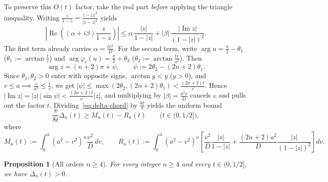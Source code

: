\documentclass[11pt,a4paper]{article}
\newcommand{\RePart}{\operatorname{Re}}
\newcommand{\ImPart}{\operatorname{Im}}
\newtheorem{proposition}{Proposition}[section]
\theoremstyle{remark}
\numberwithin{equation}{section}
\begin{document}
To preserve this $O(t)$ factor, take the real part \emph{before} applying the triangle inequality. Writing $\frac{z}{1 - z} = \frac{z - |z|^2}{|1 - z|^2}$ yields
\begin{equation}
    \left|\RePart\!\left((\alpha + i\beta)\frac{z}{1 - z}\right)\right|
    \le \alpha\,\frac{|z|}{1 - |z|} + |\beta|\,\frac{|\ImPart z|}{(1 - |z|)^2}.
    \label{eq:real-sep}
\end{equation}
The first term already carries $\alpha = \frac{tv^2}{D}$. For the second term, write $\arg u = \frac{\pi}{2} - \theta_1$ ($\theta_1 := \arctan\frac{t}{v}$) and $\arg \varphi_t(u) = \frac{\pi}{2} + \theta_2$ ($\theta_2 := \arctan\frac{tv}{a^2}$). Then
\[
    \arg z = (n + 2)\pi + \psi,
    \qquad
    \psi := 2\theta_2 - (2n + 2)\theta_1.
\]
Since $\theta_1, \theta_2 > 0$ enter with opposite signs, $\arctan y < y$ ($y > 0$), and $v \le a \implies \frac{v}{a^2} \le \frac{1}{v}$, we get $|\psi| \le \max(2\theta_2, (2n+2)\theta_1) < \frac{(2n+2)t}{v}$. Hence $|\ImPart z| = |z|\,|\sin\psi| < \frac{(2n+2)t}{v}|z|$, and multiplying by $|\beta| = \frac{a^2 v}{D}$ cancels $v$ and pulls out the factor $t$. Dividing~\eqref{eq:delta-chord} by $\frac{8t}{\pi}$ yields the uniform bound
\begin{equation}
    \frac{\pi}{8t}\Delta_n(t) \ge M_n(t) - R_n(t)
    \qquad \bigl(t \in (0, 1/2]\bigr),
    \label{eq:Mn-Rn}
\end{equation}
where
\[
    M_n(t) := \int_0^a (a^2 - v^2)^n \frac{v^2}{D}\,dv,
    \qquad
    R_n(t) := \int_0^a (a^2 - v^2)^n\left[\frac{v^2}{D}\frac{|z|}{1 - |z|}
              + \frac{(2n+2)a^2}{D}\frac{|z|}{(1 - |z|)^2}\right]dv.
\]

\begin{proposition}[All orders $n \ge 4$]
    \label{prop:n4}
    For every integer $n \ge 4$ and every $t \in (0, 1/2]$, we have $\Delta_n(t) > 0$.
\end{proposition}
\end{document}
